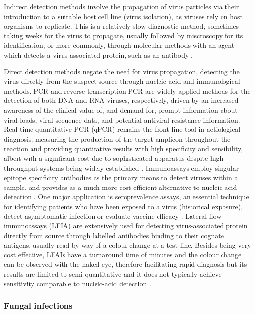 Indirect detection methods involve the propagation of virus particles via their introduction to a suitable host cell line (virus isolation), as viruses rely on host organisms to replicate. This is a relatively slow diagnostic method, sometimes taking weeks for the virus to propagate, usually followed by miscroscopy for its identification, or more commonly, through molecular methods with an agent which detects a virus-associated protein, such as an antibody \citep{cassedy_virus_2021}. 

Direct detection methods negate the need for virus propagation, detecting the virus directly from the suspect source through nucleic acid and immunological methods. PCR and reverse transcription-PCR are widely applied methods for the detection of both DNA and RNA viruses, respectively, driven by an increased awareness of the clinical value of, and demand for, prompt information about viral loads, viral sequence data, and potential antiviral resistance information. %
Real-time quantitative PCR (qPCR) remains the front line tool in aetiological diagnosis, measuring the production of the target amplicon throughout the reaction and providing quantitative results with high specificity and sensibility, albeit with a significant cost due to sophisticated apparatus despite high-throughput systems being widely established \citep{cassedy_virus_2021}. Immunoassays employ singular-epitope specificity antibodies as the primary means to detect viruses within a sample, and provides as a much more cost-efficient alternative to nucleic acid detection \citep{cassedy_virus_2021}. One major application is seroprevalence assays, an essential technique for identifying patients who have been exposed to a virus (historical exposure), detect asymptomatic infection or evaluate vaccine efficacy  \citep{chan_determining_2021, bobrovitz_global_2021}. Lateral flow immunoassays (LFIA) are extensively used for detecting virus-associated protein directly from source through labelled antibodies binding to their cognate antigens, usually read by way of a colour change at a test line. Besides being very cost effective, LFAIs have a turnaround time of minutes and the colour change can be observed with the naked eye, therefore facilitating rapid diagnosis but its results are limited to semi-quantitative and it does not typically achieve sensitivity comparable to nucleic-acid detection \citep{estrela_lateral_2016, cassedy_virus_2021, di_nardo_ten_2021}.

\subsubsection{Fungal infections}

